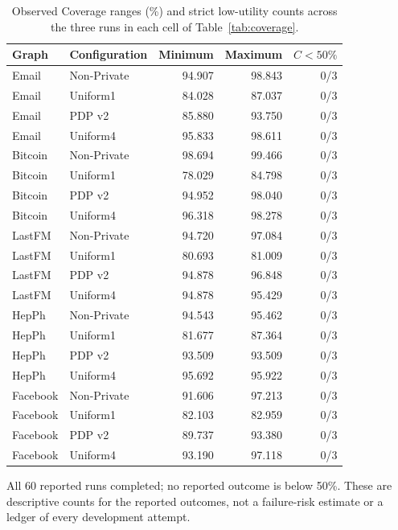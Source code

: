 \begin{table}[htbp]
\centering\small
\caption{Observed Coverage ranges (\%) and strict low-utility counts across the three runs in each cell of Table~\ref{tab:coverage}.}\label{tab:frozenranges}
\begin{tabular}{llrrr}
\toprule
Graph & Configuration & Minimum & Maximum & $C<50\%$\\ \midrule
Email & Non-Private & 94.907 & 98.843 & 0/3 \\
Email & Uniform1 & 84.028 & 87.037 & 0/3 \\
Email & PDP v2 & 85.880 & 93.750 & 0/3 \\
Email & Uniform4 & 95.833 & 98.611 & 0/3 \\
Bitcoin & Non-Private & 98.694 & 99.466 & 0/3 \\
Bitcoin & Uniform1 & 78.029 & 84.798 & 0/3 \\
Bitcoin & PDP v2 & 94.952 & 98.040 & 0/3 \\
Bitcoin & Uniform4 & 96.318 & 98.278 & 0/3 \\
LastFM & Non-Private & 94.720 & 97.084 & 0/3 \\
LastFM & Uniform1 & 80.693 & 81.009 & 0/3 \\
LastFM & PDP v2 & 94.878 & 96.848 & 0/3 \\
LastFM & Uniform4 & 94.878 & 95.429 & 0/3 \\
HepPh & Non-Private & 94.543 & 95.462 & 0/3 \\
HepPh & Uniform1 & 81.677 & 87.364 & 0/3 \\
HepPh & PDP v2 & 93.509 & 93.509 & 0/3 \\
HepPh & Uniform4 & 95.692 & 95.922 & 0/3 \\
Facebook & Non-Private & 91.606 & 97.213 & 0/3 \\
Facebook & Uniform1 & 82.103 & 82.959 & 0/3 \\
Facebook & PDP v2 & 89.737 & 93.380 & 0/3 \\
Facebook & Uniform4 & 93.190 & 97.118 & 0/3 \\
\bottomrule\end{tabular}
\par\vspace{3pt}\begin{minipage}{.97\textwidth}\footnotesize All 60 reported runs completed; no reported outcome is below 50\%. These are descriptive counts for the reported outcomes, not a failure-risk estimate or a ledger of every development attempt.\end{minipage}
\end{table}
